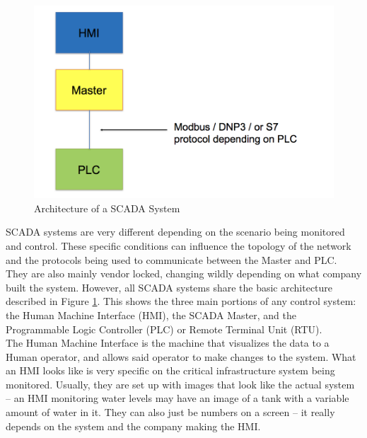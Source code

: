 \documentclass[11pt,a4paper,oldfontcommands]{memoir}
\begin{document}
\begin{figure}[ht]
  \begin{center}
  \includegraphics{normal_scada}
  \caption{Architecture of a SCADA System}
  \label{fig:1}
  \end{center}
\end{figure}

SCADA systems are very different depending on the scenario being monitored and control.
These specific conditions can influence the topology of the network and the
protocols being used to communicate between the Master and PLC. \cite{Security issues in SCADA networks} 
They are also
mainly vendor locked, changing wildly depending on what company built the system. However,
all SCADA systems share the basic architecture described in Figure \ref{fig:1}. 
This shows the three main portions of any control system: the Human Machine
Interface (HMI), the SCADA Master, and the Programmable Logic Controller (PLC) or Remote 
Terminal Unit (RTU). \\

The Human Machine Interface is the machine that visualizes the data to a Human operator,
and allows said operator to make changes to the system. What an HMI looks like is very 
specific on the critical infrastructure system being monitored. Usually, they are set
up with images that look like the actual system -- an HMI monitoring water levels may
have an image of a tank with a variable amount of water in it. They can also just be
numbers on a screen -- it really depends on the system and the company making the HMI.\\
\end{document}

